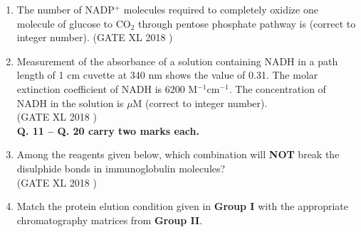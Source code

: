 \documentclass[14pt]{extarticle}
\begin{document}
\begin{flushleft}
\begin{enumerate}[leftmargin=*]
\item The number of NADP$^+$ molecules required to completely oxidize one molecule of glucose to CO$_2$ through pentose phosphate pathway is \underline{\hspace{2cm}} (correct to integer number).
\hfill(GATE XL 2018 )\\


\item Measurement of the absorbance of a solution containing NADH in a path length of 1 cm cuvette at 340 nm shows the value of 0.31. The molar extinction coefficient of NADH is 6200 M$^{-1}$cm$^{-1}$. The concentration of NADH in the solution is \underline{\hspace{2cm}} $\mu$M (correct to integer number).\\[2ex]
\hfill(GATE XL 2018 )\\


\textbf{Q. 11 – Q. 20 carry two marks each.}

\item Among the reagents given below, which combination will \textbf{NOT} break the disulphide bonds in immunoglobulin molecules?\\[2ex]
\hfill(GATE XL 2018 )\\
\begin{enumerate}[label=(\alph*)]
\end{enumerate}

\begin{enumerate}[label=(\Alph*)]
\end{enumerate}

\item Match the protein elution condition given in \textbf{Group I} with the appropriate chromatography matrices from \textbf{Group II}.


\end{enumerate}
\end{flushleft}
\end{document}
